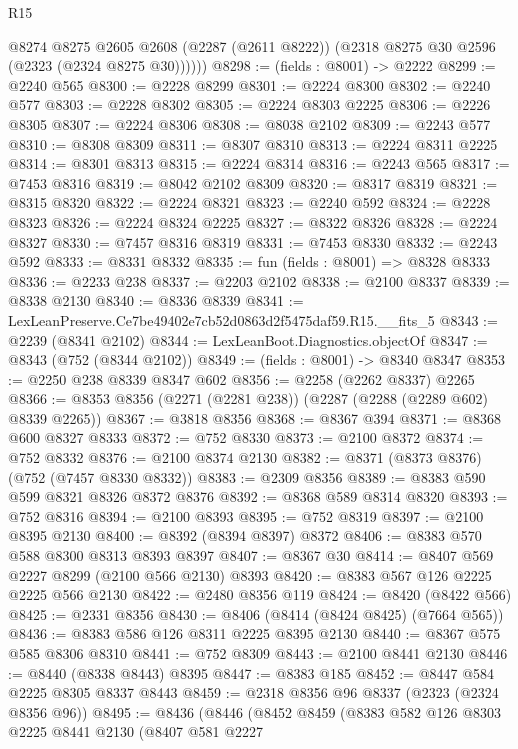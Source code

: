 \begin{lexlean}{R15}
\begin{coremodule}
        @8274
          @8275
          @2605
          @2608
          (@2287 (@2611 @8222))
          (@2318 @8275 @30 @2596 (@2323 (@2324 @8275 @30))))))
@8298 := (fields : @8001) -> @2222
@8299 := @2240 @565
@8300 := @2228 @8299
@8301 := @2224 @8300
@8302 := @2240 @577
@8303 := @2228 @8302
@8305 := @2224 @8303 @2225
@8306 := @2226 @8305
@8307 := @2224 @8306
@8308 := @8038 @2102
@8309 := @2243 @577
@8310 := @8308 @8309
@8311 := @8307 @8310
@8313 := @2224 @8311 @2225
@8314 := @8301 @8313
@8315 := @2224 @8314
@8316 := @2243 @565
@8317 := @7453 @8316
@8319 := @8042 @2102 @8309
@8320 := @8317 @8319
@8321 := @8315 @8320
@8322 := @2224 @8321
@8323 := @2240 @592
@8324 := @2228 @8323
@8326 := @2224 @8324 @2225
@8327 := @8322 @8326
@8328 := @2224 @8327
@8330 := @7457 @8316 @8319
@8331 := @7453 @8330
@8332 := @2243 @592
@8333 := @8331 @8332
@8335 := fun (fields : @8001) => @8328 @8333
@8336 := @2233 @238
@8337 := @2203 @2102
@8338 := @2100 @8337
@8339 := @8338 @2130
@8340 := @8336 @8339
@8341 := LexLeanPreserve.Ce7be49402e7cb52d0863d2f5475daf59.R15.__fits_5
@8343 := @2239 (@8341 @2102)
@8344 := LexLeanBoot.Diagnostics.objectOf
@8347 := @8343 (@752 (@8344 @2102))
@8349 := (fields : @8001) -> @8340 @8347
@8353 := @2250 @238 @8339 @8347 @602
@8356 := @2258 (@2262 @8337) @2265
@8366 := @8353 @8356 (@2271 (@2281 @238)) (@2287 (@2288 (@2289 @602) @8339 @2265))
@8367 := @3818 @8356
@8368 := @8367 @394
@8371 := @8368 @600 @8327 @8333
@8372 := @752 @8330
@8373 := @2100 @8372
@8374 := @752 @8332
@8376 := @2100 @8374 @2130
@8382 := @8371 (@8373 @8376) (@752 (@7457 @8330 @8332))
@8383 := @2309 @8356
@8389 := @8383 @590 @599 @8321 @8326 @8372 @8376
@8392 := @8368 @589 @8314 @8320
@8393 := @752 @8316
@8394 := @2100 @8393
@8395 := @752 @8319
@8397 := @2100 @8395 @2130
@8400 := @8392 (@8394 @8397) @8372
@8406 := @8383 @570 @588 @8300 @8313 @8393 @8397
@8407 := @8367 @30
@8414 := @8407 @569 @2227 @8299 (@2100 @566 @2130) @8393
@8420 := @8383 @567 @126 @2225 @2225 @566 @2130
@8422 := @2480 @8356 @119
@8424 := @8420 (@8422 @566)
@8425 := @2331 @8356
@8430 := @8406 (@8414 (@8424 @8425) (@7664 @565))
@8436 := @8383 @586 @126 @8311 @2225 @8395 @2130
@8440 := @8367 @575 @585 @8306 @8310
@8441 := @752 @8309
@8443 := @2100 @8441 @2130
@8446 := @8440 (@8338 @8443) @8395
@8447 := @8383 @185
@8452 := @8447 @584 @2225 @8305 @8337 @8443
@8459 := @2318 @8356 @96 @8337 (@2323 (@2324 @8356 @96))
@8495 := @8436
    (@8446
      (@8452
        @8459
        (@8383
          @582
          @126
          @8303
          @2225
          @8441
          @2130
          (@8407
            @581
            @2227

\end{coremodule}
\end{lexlean}
